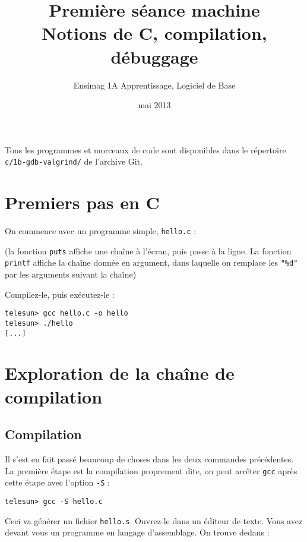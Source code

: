 \documentclass[11pt]{article}
\title{Première séance machine\\Notions de C, compilation, débuggage}
\author{Ensimag 1A Apprentissage, Logiciel de Base}
\date{mai 2013}
\begin{document}
\maketitle

Tous les programmes et morceaux de code sont disponibles dans le
répertoire \texttt{c/1b-gdb-valgrind/} de l'archive Git.

\section{Premiers pas en C}

On commence avec un programme simple, \texttt{hello.c} :



(la fonction \texttt{puts} affiche une chaîne à l'écran, puis passe à
la ligne. La fonction \texttt{printf} affiche la chaîne donnée en
argument, dans laquelle on remplace les \texttt{"\%d"} par les
arguments suivant la chaîne)


Compilez-le, puis exécutez-le :

\begin{verbatim}
telesun> gcc hello.c -o hello
telesun> ./hello
[...]
\end{verbatim}

\section{Exploration de la chaîne de compilation}

\subsection{Compilation}

Il s'est en fait passé beaucoup de choses dans les deux commandes
précédentes. La première étape est la compilation proprement dite, on
peut arrêter \texttt{gcc} après cette étape avec l'option
\texttt{-S} :

\begin{verbatim}
telesun> gcc -S hello.c
\end{verbatim}

Ceci va générer un fichier \texttt{hello.s}. Ouvrez-le dans un éditeur
de texte. Vous avez devant vous un programme en langage d'assemblage.
On trouve dedans :
\end{document}
